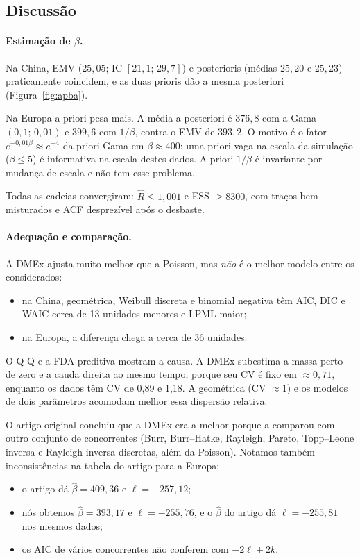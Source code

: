 \documentclass[11pt,a4paper]{article}
\begin{document}
\subsection{Discussão}

\paragraph{Estimação de $\beta$.} Na China, EMV ($25{,}05$; IC $[21{,}1;\,29{,}7]$) e posterioris (médias $25{,}20$ e $25{,}23$) praticamente coincidem, e as duas prioris dão a mesma posteriori (Figura~\ref{fig:apba}).

Na Europa a priori pesa mais. A média a posteriori é $376{,}8$ com a Gama$(0{,}1;\,0{,}01)$ e $399{,}6$ com $1/\beta$, contra o EMV de $393{,}2$. O motivo é o fator $e^{-0{,}01\beta}\approx e^{-4}$ da priori Gama em $\beta\approx400$: uma priori vaga na escala da simulação ($\beta\le5$) é informativa na escala destes dados. A priori $1/\beta$ é invariante por mudança de escala e não tem esse problema.

Todas as cadeias convergiram: $\hat R\le1{,}001$ e ESS $\ge8300$, com traços bem misturados e ACF desprezível após o desbaste.

\paragraph{Adequação e comparação.} A DMEx ajusta muito melhor que a Poisson, mas \emph{não} é o melhor modelo entre os considerados:
\begin{itemize}
\item na China, geométrica, Weibull discreta e binomial negativa têm AIC, DIC e WAIC cerca de 13 unidades menores e LPML maior;
\item na Europa, a diferença chega a cerca de 36 unidades.
\end{itemize}
O Q-Q e a FDA preditiva mostram a causa. A DMEx subestima a massa perto de zero e a cauda direita ao mesmo tempo, porque seu CV é fixo em $\approx0{,}71$, enquanto os dados têm CV de 0,89 e 1,18. A geométrica (CV $\approx1$) e os modelos de dois parâmetros acomodam melhor essa dispersão relativa.

O artigo original concluiu que a DMEx era a melhor porque a comparou com outro conjunto de concorrentes (Burr, Burr--Hatke, Rayleigh, Pareto, Topp--Leone inversa e Rayleigh inversa discretas, além da Poisson). Notamos também inconsistências na tabela do artigo para a Europa:
\begin{itemize}
\item o artigo dá $\hat\beta=409{,}36$ e $\ell=-257{,}12$;
\item nós obtemos $\hat\beta=393{,}17$ e $\ell=-255{,}76$, e o $\hat\beta$ do artigo dá $\ell=-255{,}81$ nos mesmos dados;
\item os AIC de vários concorrentes não conferem com $-2\ell+2k$.
\end{itemize}
\end{document}
